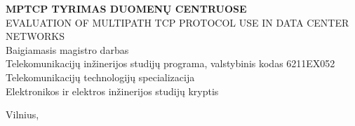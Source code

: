 \documentclass[12pt]{article}
\begin{document}
\begin{titlepage}
    {\large{\bfseries{MPTCP TYRIMAS DUOMENŲ CENTRUOSE}}}  \\[-5.0pt]
    {\large{EVALUATION OF MULTIPATH TCP PROTOCOL
                USE IN DATA CENTER NETWORKS}}             \\[36.5pt]

    {\large Baigiamasis magistro darbas}                  \\[1.9pt]

    Telekomunikacijų inžinerijos studijų programa,
    valstybinis kodas 6211EX052                           \\
    Telekomunikacijų technologijų specializacija          \\
    Elektronikos ir elektros inžinerijos studijų kryptis  \\

    \vspace{\fill}

    Vilnius, \the\year

\end{titlepage}

\restoregeometry                       %

  \blindtext[10]                       %
\end{document}
